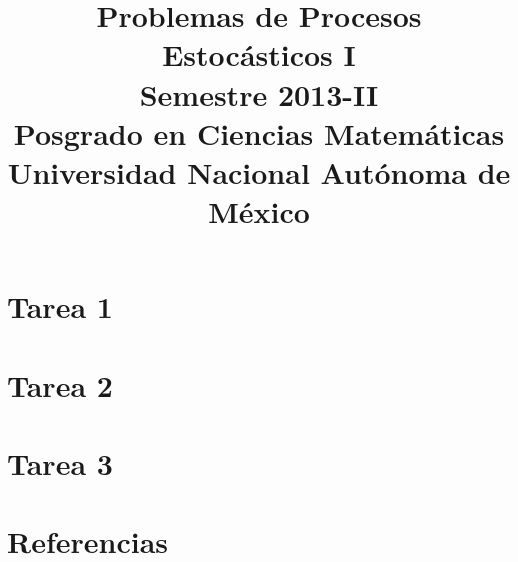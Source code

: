 \documentclass[a5paper,oneside]{amsart}
\title[Problemas de Procesos I]{
	Problemas de Procesos Estocásticos I\\ Semestre 2013-II\\ Posgrado en Ciencias Matemáticas\\ Universidad Nacional Autónoma de México
}
\theoremstyle{dotless}
\numberwithin{section}{part}
\numberwithin{equation}{subsection}
\begin{document}
	\maketitle
	\part{Tarea 1}
		
		
		\nqed
		
	\part{Tarea 2}
		
		
		\nqed
		
	\part{Tarea 3}
		
		
		\nqed
		
	\part*{Referencias}
	
	
\end{document}
